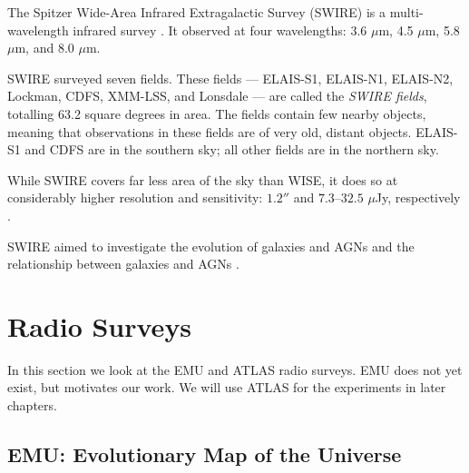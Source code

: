             The Spitzer Wide-Area Infrared Extragalactic Survey (SWIRE) is a
            multi-wavelength infrared survey \citep{lonsdale03}. It observed at four wavelengths:
            3.6 $\mu$m, 4.5 $\mu$m, 5.8 $\mu$m, and 8.0 $\mu$m.

            SWIRE surveyed seven fields. These fields --- ELAIS-S1, ELAIS-N1,
            ELAIS-N2, Lockman, CDFS, XMM-LSS, and Lonsdale --- are called the
            \emph{SWIRE fields}, totalling 63.2 square degrees in area. The
            fields contain few nearby objects, meaning that observations in
            these fields are of very old, distant objects. ELAIS-S1 and CDFS are
            in the southern sky; all other fields are in the northern sky.

            While SWIRE covers far less area of the sky than WISE, it does so at
            considerably higher resolution and sensitivity: $1.2''$ and
            $7.3$--$32.5$ $\mu$Jy, respectively \citep{irac-pocket-guide,
            surace05}.

            SWIRE aimed to investigate the evolution of galaxies and AGNs and
            the relationship between galaxies and AGNs \citep{surace05}.


    \section{Radio Surveys}
    \label{sec:radio-surveys}

        In this section we look at the EMU and ATLAS radio surveys. EMU does not
        yet exist, but motivates our work. We will use ATLAS for the experiments
        in later chapters.

        \subsection{EMU: Evolutionary Map of the Universe}
        \label{sec:emu}


